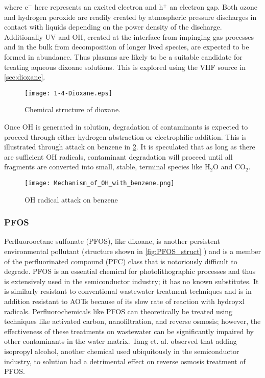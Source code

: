 where e$^-$ here represents an excited electron and h$^+$ an electron gap. Both ozone and hydrogen peroxide are readily created by atmospheric pressure discharges in contact with liquids depending on the power density of the discharge. \cite{Pavlovich2013g} Additionally UV and OH, created at the interface from impinging gas processes and in the bulk from decomposition of longer lived species, are expected to be formed in abundance. \cite{Tian2014} Thus plasmas are likely to be a suitable candidate for treating aqueous dixoane solutions. This is explored using the VHF source in \cref{sec:dioxane}.

\begin{figure}[htbp]
  \centering
  \texttt{[image: 1-4-Dioxane.eps]}
  \caption{Chemical structure of dioxane.}
  \label{fig:diox_struct}
\end{figure}

Once OH is generated in solution, degradation of contaminants is expected to proceed through either hydrogen abstraction or electrophilic addition. This is illustrated through attack on benzene in \cref{fig:benzene_attack}. \cite{solarchem} It is speculated that as long as there are sufficient OH radicals, contaminant degradation will proceed until all fragments are converted into small, stable, terminal species like H$_2$O and CO$_2$.

\begin{figure}[htpb]
  \centering
  \texttt{[image: Mechanism\_of\_OH\_with\_benzene.png]}
  \caption{OH radical attack on benzene}
  \label{fig:benzene_attack}
\end{figure}

\subsubsection{PFOS}

Perfluorooctane sulfonate (PFOS), like dixoane, is another persistent environmental pollutant (structure shown in \cref{fig:PFOS_struct} \cite{pfosStruct}) and is a member of the perfluorinated compound (PFC) class that is notoriously difficult to degrade. PFOS is an essential chemical for photolithographic processes and thus is extensively used in the semiconductor industry; it has no known substitutes. \cite{tang2006use} It is similarly resistant to conventional wastewater treatment techniques and is in addition resistant to AOTs because of its slow rate of reaction with hydroyxl radicals. \cite{cheng2008sonochemical} Perfluorochemicals like PFOS can theoretically be treated using techniques like activated carbon, nanofiltration, and reverse osmosis; however, the effectiveness of these treatments on wastewater can be significantly impaired by other contaminants in the water matrix. \cite{tang2006use,tang2007effect} Tang et. al. observed that adding isopropyl alcohol, another chemical used ubiquitously in the semiconductor industry, to solution had a detrimental effect on reverse osmosis treatment of PFOS. \cite{tang2006use}

